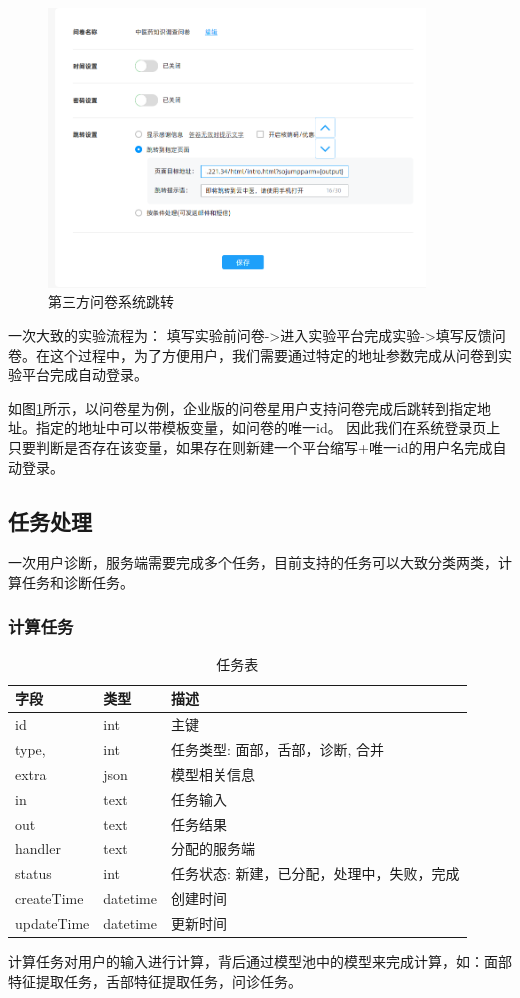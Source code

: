 \begin{figure}[h]
    \centering
    \includegraphics[width=10cm]{images/wjx1.png}
    \caption{第三方问卷系统跳转}
    \label{fig:wjx-ssojump}
\end{figure}

一次大致的实验流程为： 填写实验前问卷->进入实验平台完成实验->填写反馈问卷。在这个过程中，为了方便用户，我们需要通过特定的地址参数完成从问卷到实验平台完成自动登录。

如图\ref{fig:wjx-ssojump}所示，以问卷星为例，企业版的问卷星用户支持问卷完成后跳转到指定地址。指定的地址中可以带模板变量，如问卷的唯一id。
因此我们在系统登录页上只要判断是否存在该变量，如果存在则新建一个平台缩写+唯一id的用户名完成自动登录。


\subsection{任务处理}
一次用户诊断，服务端需要完成多个任务，目前支持的任务可以大致分类两类，计算任务和诊断任务。


\subsubsection{计算任务}
\begin{table}[]
    \centering
    \begin{tabular}{lll}
        \toprule
        字段 & 类型 & 描述 \\ 
        \midrule
        id & int & 主键 \\
        type, & int & 任务类型: 面部，舌部，诊断, 合并 \\ 
        extra & json & 模型相关信息 \\
        in & text & 任务输入 \\
        out & text & 任务结果 \\
        handler & text & 分配的服务端 \\
        status & int & 任务状态: 新建，已分配，处理中，失败，完成 \\
        createTime & datetime & 创建时间 \\
        updateTime & datetime & 更新时间\\
        \bottomrule
    \end{tabular}
    \caption{任务表}
    \label{tab:task}
\end{table}
计算任务对用户的输入进行计算，背后通过模型池中的模型来完成计算，如：面部特征提取任务，舌部特征提取任务，问诊任务。

